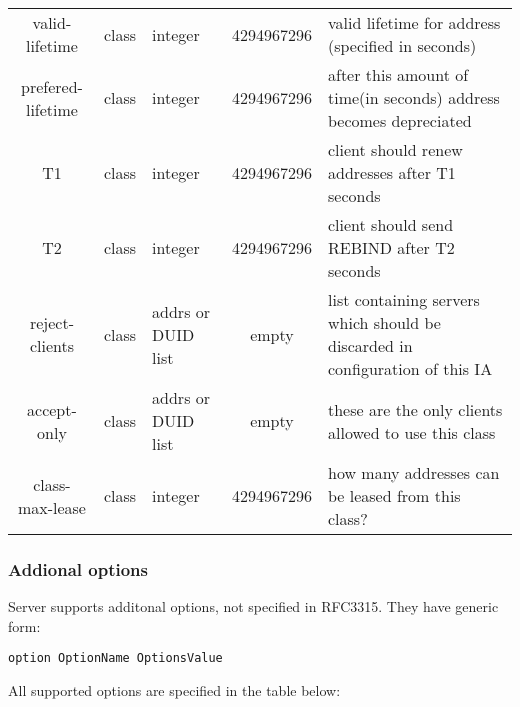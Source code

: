 \begin{tabular}{|c|c|>{\centering}p{1.7cm}<{}|c|p{6cm}|}
valid-lifetime   & class   & integer     & 4294967296 & valid lifetime for address (specified in seconds)\\
prefered-lifetime& class   & integer     & 4294967296 & after this amount of time(in seconds) address becomes depreciated\\
T1               & class   & integer     & 4294967296 & client should renew addresses after T1 seconds \\
T2               & class   & integer     & 4294967296 & client should send REBIND after T2 seconds\\
reject-clients   & class   & addrs or 
                             DUID list   & empty      & list containing servers which should be discarded in configuration of this IA \\
accept-only      & class   & addrs or
                             DUID list   & empty      & these are the only clients allowed to use this class\\
class-max-lease  & class   & integer     & 4294967296 & how many addresses can be leased from this class? \\
\hline
\end{tabular}

\subsubsection{Addional options}
Server supports additonal options, not specified in RFC3315. They have
generic form:

\begin{verbatim}
option OptionName OptionsValue
\end{verbatim}

All supported options are specified in the table below:

